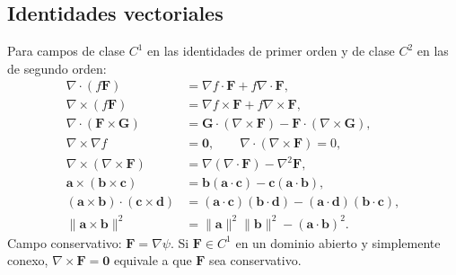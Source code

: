 \subsection*{Identidades vectoriales}
Para campos de clase $C^1$ en las identidades de primer orden y de clase $C^2$
en las de segundo orden:
\begin{align*}
\nabla\cdot(f\mathbf F)&=\nabla f\cdot\mathbf F+f\nabla\cdot\mathbf F,\\
\nabla\times(f\mathbf F)&=\nabla f\times\mathbf F+f\nabla\times\mathbf F,\\
\nabla\cdot(\mathbf F\times\mathbf G)&=\mathbf G\cdot(\nabla\times\mathbf F)
-\mathbf F\cdot(\nabla\times\mathbf G),\\
\nabla\times\nabla f&=\mathbf0,\qquad \nabla\cdot(\nabla\times\mathbf F)=0,\\
\nabla\times(\nabla\times\mathbf F)&=\nabla(\nabla\cdot\mathbf F)-\nabla^2\mathbf F,\\
\mathbf a\times(\mathbf b\times\mathbf c)&=\mathbf b(\mathbf a\cdot\mathbf c)-\mathbf c(\mathbf a\cdot\mathbf b),\\
(\mathbf a\times\mathbf b)\cdot(\mathbf c\times\mathbf d)
&=(\mathbf a\cdot\mathbf c)(\mathbf b\cdot\mathbf d)-(\mathbf a\cdot\mathbf d)(\mathbf b\cdot\mathbf c),\\
\|\mathbf a\times\mathbf b\|^2&=\|\mathbf a\|^2\|\mathbf b\|^2-(\mathbf a\cdot\mathbf b)^2.
\end{align*}
Campo conservativo: $\mathbf F=\nabla\psi$.
Si $\mathbf F\in C^1$ en un dominio abierto y simplemente conexo,
$\nabla\times\mathbf F=\mathbf0$ equivale a que $\mathbf F$ sea conservativo.
\endgroup
